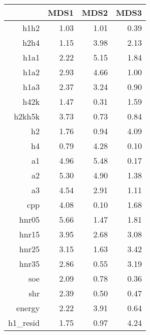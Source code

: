 \begin{table}[ht]
\centering
\begin{tabular}{rrrr}
  \hline
 & MDS1 & MDS2 & MDS3 \\ 
  \hline
h1h2 & 1.03 & 1.01 & 0.39 \\ 
  h2h4 & 1.15 & 3.98 & 2.13 \\ 
  h1a1 & 2.22 & 5.15 & 1.84 \\ 
  h1a2 & 2.93 & 4.66 & 1.00 \\ 
  h1a3 & 2.37 & 3.24 & 0.90 \\ 
  h42k & 1.47 & 0.31 & 1.59 \\ 
  h2kh5k & 3.73 & 0.73 & 0.84 \\ 
  h2 & 1.76 & 0.94 & 4.09 \\ 
  h4 & 0.79 & 4.28 & 0.10 \\ 
  a1 & 4.96 & 5.48 & 0.17 \\ 
  a2 & 5.30 & 4.90 & 1.38 \\ 
  a3 & 4.54 & 2.91 & 1.11 \\ 
  cpp & 4.08 & 0.10 & 1.68 \\ 
  hnr05 & 5.66 & 1.47 & 1.81 \\ 
  hnr15 & 3.95 & 2.68 & 3.08 \\ 
  hnr25 & 3.15 & 1.63 & 3.42 \\ 
  hnr35 & 2.86 & 0.55 & 3.19 \\ 
  soe & 2.09 & 0.78 & 0.36 \\ 
  shr & 2.39 & 0.50 & 0.47 \\ 
  energy & 2.22 & 3.91 & 0.64 \\ 
  h1\_resid & 1.75 & 0.97 & 4.24 \\ 
   \hline
\end{tabular}
\end{table}

